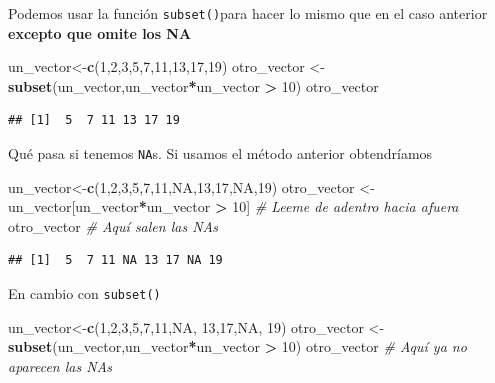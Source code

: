 \documentclass[
]{book}
\newenvironment{Shaded}{\begin{snugshade}}{\end{snugshade}}
\newcommand{\CommentTok}[1]{\textcolor[rgb]{0.56,0.35,0.01}{\textit{#1}}}
\newcommand{\ConstantTok}[1]{\textcolor[rgb]{0.56,0.35,0.01}{#1}}
\newcommand{\DecValTok}[1]{\textcolor[rgb]{0.00,0.00,0.81}{#1}}
\newcommand{\FunctionTok}[1]{\textcolor[rgb]{0.13,0.29,0.53}{\textbf{#1}}}
\newcommand{\NormalTok}[1]{#1}
\newcommand{\OtherTok}[1]{\textcolor[rgb]{0.56,0.35,0.01}{#1}}
\newcommand{\SpecialCharTok}[1]{\textcolor[rgb]{0.81,0.36,0.00}{\textbf{#1}}}
\begin{document}
Podemos usar la función \texttt{subset()}para hacer lo mismo que en el caso anterior \textbf{excepto que omite los NA}

\begin{Shaded}
\begin{Highlighting}[]
\NormalTok{un\_vector}\OtherTok{\textless{}{-}}\FunctionTok{c}\NormalTok{(}\DecValTok{1}\NormalTok{,}\DecValTok{2}\NormalTok{,}\DecValTok{3}\NormalTok{,}\DecValTok{5}\NormalTok{,}\DecValTok{7}\NormalTok{,}\DecValTok{11}\NormalTok{,}\DecValTok{13}\NormalTok{,}\DecValTok{17}\NormalTok{,}\DecValTok{19}\NormalTok{) }
\NormalTok{otro\_vector }\OtherTok{\textless{}{-}} \FunctionTok{subset}\NormalTok{(un\_vector,un\_vector}\SpecialCharTok{*}\NormalTok{un\_vector }\SpecialCharTok{\textgreater{}} \DecValTok{10}\NormalTok{)   }
\NormalTok{otro\_vector}
\end{Highlighting}
\end{Shaded}

\begin{verbatim}
## [1]  5  7 11 13 17 19
\end{verbatim}

Qué pasa si tenemos \texttt{NA}s. Si usamos el método anterior obtendríamos

\begin{Shaded}
\begin{Highlighting}[]
\NormalTok{un\_vector}\OtherTok{\textless{}{-}}\FunctionTok{c}\NormalTok{(}\DecValTok{1}\NormalTok{,}\DecValTok{2}\NormalTok{,}\DecValTok{3}\NormalTok{,}\DecValTok{5}\NormalTok{,}\DecValTok{7}\NormalTok{,}\DecValTok{11}\NormalTok{,}\ConstantTok{NA}\NormalTok{,}\DecValTok{13}\NormalTok{,}\DecValTok{17}\NormalTok{,}\ConstantTok{NA}\NormalTok{,}\DecValTok{19}\NormalTok{) }
\NormalTok{otro\_vector }\OtherTok{\textless{}{-}}\NormalTok{ un\_vector[un\_vector}\SpecialCharTok{*}\NormalTok{un\_vector }\SpecialCharTok{\textgreater{}} \DecValTok{10}\NormalTok{]   }\CommentTok{\# Leeme de adentro hacia afuera}
\NormalTok{otro\_vector  }\CommentTok{\# Aquí salen las NAs}
\end{Highlighting}
\end{Shaded}

\begin{verbatim}
## [1]  5  7 11 NA 13 17 NA 19
\end{verbatim}

En cambio con \texttt{subset()}

\begin{Shaded}
\begin{Highlighting}[]
\NormalTok{un\_vector}\OtherTok{\textless{}{-}}\FunctionTok{c}\NormalTok{(}\DecValTok{1}\NormalTok{,}\DecValTok{2}\NormalTok{,}\DecValTok{3}\NormalTok{,}\DecValTok{5}\NormalTok{,}\DecValTok{7}\NormalTok{,}\DecValTok{11}\NormalTok{,}\ConstantTok{NA}\NormalTok{, }\DecValTok{13}\NormalTok{,}\DecValTok{17}\NormalTok{,}\ConstantTok{NA}\NormalTok{, }\DecValTok{19}\NormalTok{) }
\NormalTok{otro\_vector }\OtherTok{\textless{}{-}} \FunctionTok{subset}\NormalTok{(un\_vector,un\_vector}\SpecialCharTok{*}\NormalTok{un\_vector }\SpecialCharTok{\textgreater{}} \DecValTok{10}\NormalTok{)   }
\NormalTok{otro\_vector  }\CommentTok{\# Aquí ya no aparecen las NAs}
\end{Highlighting}
\end{Shaded}
\end{document}
